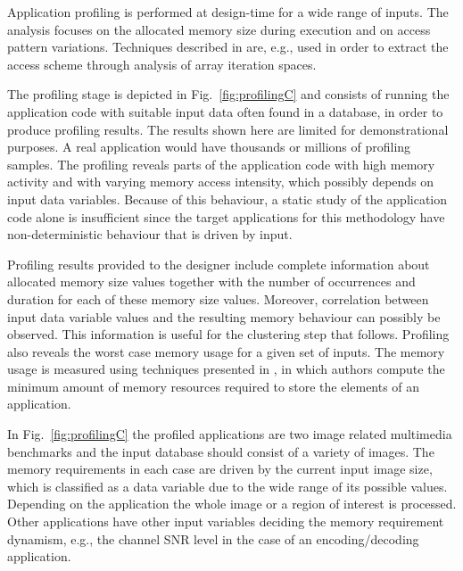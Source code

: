 Application profiling is performed at design-time for a wide range of inputs. 
The analysis focuses on the allocated memory size during execution and on access pattern variations. 
Techniques described in \cite{Ang13b} are, e.g., used in order to extract the access scheme through analysis of array iteration spaces.  

The profiling stage is depicted in Fig.~\ref{fig:profilingC} and consists of running the application code with suitable input data often found in a database, in order to produce profiling results. 
The results shown here are limited for demonstrational purposes. 
A real application would have thousands or millions of profiling samples. 
The profiling reveals parts of the application code with high memory activity and with varying memory access intensity, which possibly depends on input data variables. 
Because of this behaviour, a static study of the application code alone is insufficient since the target applications for this methodology have non-deterministic behaviour that is driven by input.

Profiling results provided to the designer include complete information about allocated memory size values together with the number of occurrences and duration for each of these memory size values. 
Moreover, correlation between input data variable values and the resulting memory behaviour can possibly be observed. This information is useful for the clustering step that follows. 
Profiling also reveals the worst case memory usage for a given set of inputs. 
The memory usage is measured using techniques presented in \cite{Ang13b}, in which authors compute the minimum amount of memory resources required to store the elements of an application. 

In Fig.~\ref{fig:profilingC} the profiled applications are two image related multimedia benchmarks and the input database should consist of a variety of images. 
The memory requirements in each case are driven by the current input image size, which is classified as a data variable due to the wide range of its possible values. 
Depending on the application the whole image or a region of interest is processed. 
Other applications have other input variables deciding the memory requirement dynamism, e.g., the channel SNR level in the case of an encoding/decoding application.

